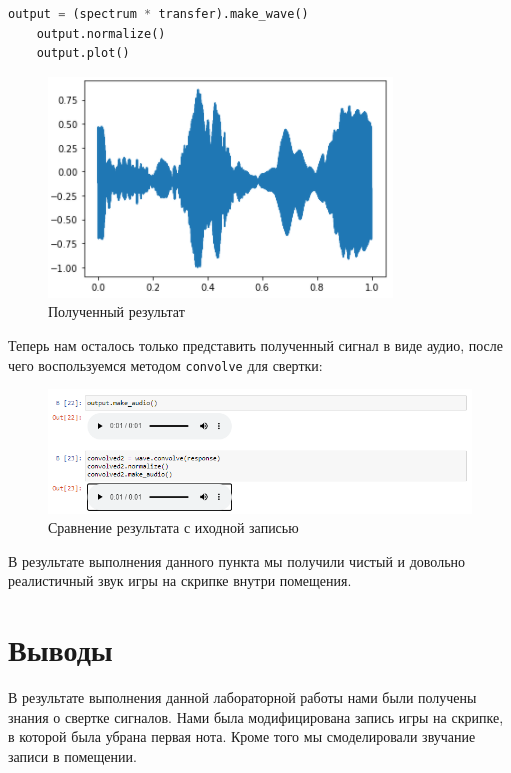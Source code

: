 \documentclass[a4paper]{article}
\begin{document}
\begin{lstlisting}[language=Python, caption= Получение результата]
    output = (spectrum * transfer).make_wave()
    output.normalize()
    output.plot()
\end{lstlisting}
            
            \begin{figure}[H]
                \centering
                \includegraphics{ex_2_6.png}
                \caption{Полученный результат}
                \label{fig:ex_2_6}
            \end{figure}
            
            Теперь нам осталось только представить полученный сигнал в виде аудио, после чего воспользуемся методом \texttt{convolve} для свертки:
            
            \begin{figure}[H]
                \centering
                \includegraphics[width=\textwidth]{ex_2_7.png}
                \caption{Сравнение результата с иходной записью}
                \label{fig:ex_2_7}
            \end{figure}
            
            В результате выполнения данного пункта мы получили чистый и довольно реалистичный звук игры на скрипке внутри помещения.
            
    \newpage
        \section{Выводы}
             В результате выполнения данной лабораторной работы нами были получены знания о свертке сигналов. Нами была модифицирована запись игры на скрипке, в которой была убрана первая нота. Кроме того мы смоделировали звучание записи в помещении.
            
\end{document}
